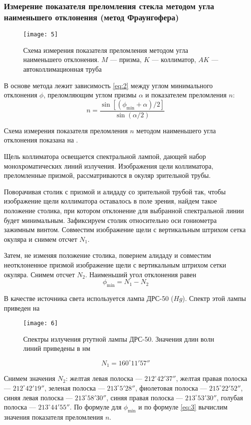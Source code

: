 \documentclass[a4paper, 12pt]{article}
\begin{document}
\subsubsection*{Измерение показателя преломления стекла методом угла
наименьшего отклонения (метод Фраунгофера)}

\begin{wrapfigure}{l}{0.5\linewidth}
    \texttt{[image: 5]}
    \caption{Схема измерения показателя преломления методом угла
    наименьшего отклонения. $M$ --- призма, $K$ --- коллиматор, $AK$
--- автоколлимационная труба}
\label{fig:5}
\end{wrapfigure}

В основе метода лежит зависимость \eqref{eq:2} между углом
минимального отклонения $\phi$, преломляющим углом призмы $\alpha$ и
показателем преломления $n$:
\[
    n = \frac{\sin[(\phi_\text{min}+\alpha)/2]}{\sin(\alpha/2)}
\]

Схема измерения показателя преломления $n$ методом наименьшего угла
отклонения показана на .

Щель коллиматора освещается спектральной лампой, дающей набор
монохроматических линий излучения. Изображения цели коллиматора,
преломленные призмой, рассматриваются в окуляр зрительной трубы.

Поворачивая столик с призмой и алидаду со зрительной трубой так, чтобы
изображение щели коллиматора оставалось в поле зрения, найдем такое
положение столика, при котором отклонение для выбранной спектральной
линии будет минимальным. Зафиксируем столик относительно оси
гониометра зажимным винтом. Совместим изображение щели с вертикальным
штрихом сетка окуляра и снимем отсчет $N_1$.

Затем, не изменяя положение столика, повернем алидаду и совместим
неотклоненное призмой изображение щели с вертикальным штрихом сетки
окуляра. Снимем отсчет $N_2$. Наименьший угол отклонения равен
\[
    \phi_\text{min} = N_1 - N_2
\]

В качестве источника света используется лампа ДРС-50 ($Hg$). Спектр
этой лампы приведен на 


\begin{figure}[H]
    \texttt{[image: 6]} 
    \caption{Спектры излучения ртутной лампы ДРС-50. Значения длин
    волн линий приведены в нм}
    \label{fig:6}
\end{figure}

\[
    N_1 = 160^\circ 11' 57''
\]

Снимем значения $N_2$: желтая левая полоска --- $212^\circ 42'37''$,
желтая правая полоска --- $212^\circ 42' 19''$, зеленая полоска ---
$213^\circ 5' 28''$, фиолетовая полоска --- $215^\circ 22' 52''$,
синяя левая полоска --- $213^\circ 58' 30''$, синяя правая полоска ---
$213^\circ 53' 30''$, голубая полоска --- $213^\circ 44' 55''$. По
формуле для $\phi_\text{min}$ и по формуле \eqref{eq:3} вычислим
значения показателя преломления $n$.
\end{document}
